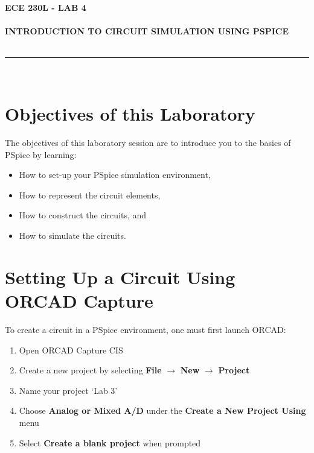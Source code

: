 \documentclass[12pt]{../manual}
\begin{document}
\begin{center}
\textbf{\huge ECE 230L - LAB 4}\\~\\
\textbf{\large INTRODUCTION TO CIRCUIT SIMULATION USING PSPICE}\\~\\
\rule{6.5in}{0.5mm}\\
\end{center}

\tableofcontents

\listoffigures

\newpage
%
\section{Objectives of this Laboratory}
The objectives of this laboratory session are to introduce you to the basics of PSpice by learning:
\begin{itemize}
\item How to set-up your PSpice simulation environment,
\item How to represent the circuit elements,
\item How to construct the circuits, and
\item How to simulate the circuits.
\end{itemize}
%
\section{Setting Up a Circuit Using ORCAD Capture}
To create a circuit in a PSpice environment, one must first launch ORCAD:
\begin{enumerate}
	\item Open ORCAD Capture CIS
	\item Create a new project by selecting {\bf File} $\to$ {\bf New} $\to$ {\bf Project}
	\item Name your project `Lab 3'
	\item Choose {\bf Analog or Mixed A/D} under the {\bf Create a New Project Using} menu
	\item Select {\bf Create a blank project} when prompted
\end{enumerate}
\end{document}
